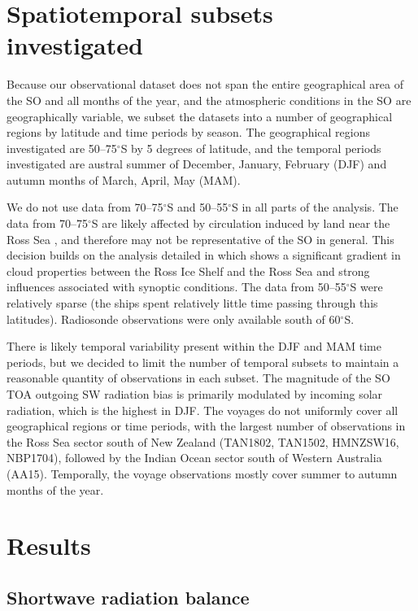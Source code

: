 \section{Spatiotemporal subsets investigated}
\label{sec:2:domains}

Because our observational dataset does not span the entire geographical area of
the SO and all months of the year, and the atmospheric conditions in the SO are
geographically variable, we subset the datasets into a number of geographical
regions by latitude and time periods by season. The geographical regions
investigated are 50--75$^\circ$S by 5 degrees of latitude, and the temporal
periods investigated are austral summer of December, January, February (DJF)
and autumn months of March, April, May (MAM).

We do not use data from 70--75$^\circ$S and 50--55$^\circ$S in all parts of
the analysis.  The data from 70--75$^\circ$S are likely affected by
circulation induced by land near the Ross Sea \citep{coggins2014}, and
therefore may not be representative of the SO in general. This decision builds
on the analysis detailed in \cite{jolly2018} which shows a significant gradient
in cloud properties between the Ross Ice Shelf and the Ross Sea and strong
influences associated with synoptic conditions. The data from 50--55$^\circ$S
were relatively sparse (the ships spent relatively little time passing through
this latitudes). Radiosonde observations were only available south of
60$^\circ$S.

There is likely temporal variability present within the DJF and MAM
time periods, but we decided to limit the number of temporal subsets
to maintain a reasonable quantity of observations in each subset.
The magnitude of the SO TOA outgoing SW radiation bias is primarily modulated
by incoming solar radiation, which is the highest in DJF.
The voyages do not uniformly cover all geographical regions or time periods,
with the largest number of observations in the Ross Sea sector south of New
Zealand (TAN1802, TAN1502, HMNZSW16, NBP1704), followed by the Indian Ocean
sector south of Western Australia (AA15). Temporally, the voyage observations
mostly cover summer to autumn months of the year.

\section{Results}

\subsection{Shortwave radiation balance}
\label{sec:2:sw-radiation-balance}

